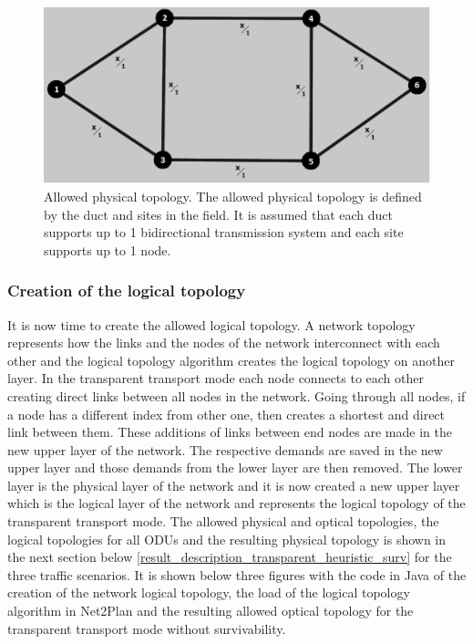 \begin{figure}[H]
\centering
\includegraphics[width=12cm]{sdf/heuristic/transparent/figures/allowed_physical}
\caption{Allowed physical topology. The allowed physical topology is defined by the duct and sites in the field. It is assumed that each duct supports up to 1 bidirectional transmission system and each site supports up to 1 node.}
\label{allowed_physical_surv_transp}
\end{figure}

\subsubsection{Creation of the logical topology}

\vspace{11pt}
It is now time to create the allowed logical topology. A network topology represents how the links and the nodes of the network interconnect with each other and the logical topology algorithm creates the logical topology on another layer. In the transparent transport mode each node connects to each other creating direct links between all nodes in the network. Going through all nodes, if a node has a different index from other one, then creates a shortest and direct link between them. These additions of links between end nodes are made in the new upper layer of the network. The respective demands are saved in the new upper layer and those demands from the lower layer are then removed. The lower layer is the physical layer of the network and it is now created a new upper layer which is the logical layer of the network and represents the logical topology of the transparent transport mode.
The allowed physical and optical topologies, the logical topologies for all ODUs and the resulting physical topology is shown in the next section below \ref{result_description_transparent_heuristic_surv} for the three traffic scenarios. It is shown below three figures with the code in Java of the creation of the network logical topology, the load of the logical topology algorithm in Net2Plan and the resulting allowed optical topology for the transparent transport mode without survivability.

